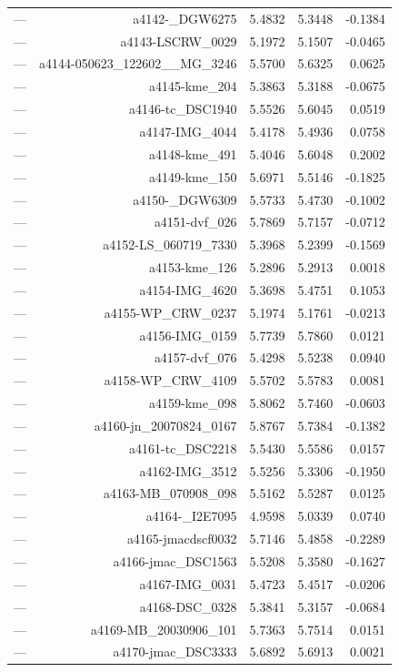 \begin{table}[htbp]
\begin{tabular}{lrrrr}
— & a4142-_DGW6275 & 5.4832 & 5.3448 & -0.1384 \\
— & a4143-LSCRW_0029 & 5.1972 & 5.1507 & -0.0465 \\
— & a4144-050623_122602__MG_3246 & 5.5700 & 5.6325 & 0.0625 \\
— & a4145-kme_204 & 5.3863 & 5.3188 & -0.0675 \\
— & a4146-tc_DSC1940 & 5.5526 & 5.6045 & 0.0519 \\
— & a4147-IMG_4044 & 5.4178 & 5.4936 & 0.0758 \\
— & a4148-kme_491 & 5.4046 & 5.6048 & 0.2002 \\
— & a4149-kme_150 & 5.6971 & 5.5146 & -0.1825 \\
— & a4150-_DGW6309 & 5.5733 & 5.4730 & -0.1002 \\
— & a4151-dvf_026 & 5.7869 & 5.7157 & -0.0712 \\
— & a4152-LS_060719_7330 & 5.3968 & 5.2399 & -0.1569 \\
— & a4153-kme_126 & 5.2896 & 5.2913 & 0.0018 \\
— & a4154-IMG_4620 & 5.3698 & 5.4751 & 0.1053 \\
— & a4155-WP_CRW_0237 & 5.1974 & 5.1761 & -0.0213 \\
— & a4156-IMG_0159 & 5.7739 & 5.7860 & 0.0121 \\
— & a4157-dvf_076 & 5.4298 & 5.5238 & 0.0940 \\
— & a4158-WP_CRW_4109 & 5.5702 & 5.5783 & 0.0081 \\
— & a4159-kme_098 & 5.8062 & 5.7460 & -0.0603 \\
— & a4160-jn_20070824_0167 & 5.8767 & 5.7384 & -0.1382 \\
— & a4161-tc_DSC2218 & 5.5430 & 5.5586 & 0.0157 \\
— & a4162-IMG_3512 & 5.5256 & 5.3306 & -0.1950 \\
— & a4163-MB_070908_098 & 5.5162 & 5.5287 & 0.0125 \\
— & a4164-_I2E7095 & 4.9598 & 5.0339 & 0.0740 \\
— & a4165-jmacdscf0032 & 5.7146 & 5.4858 & -0.2289 \\
— & a4166-jmac_DSC1563 & 5.5208 & 5.3580 & -0.1627 \\
— & a4167-IMG_0031 & 5.4723 & 5.4517 & -0.0206 \\
— & a4168-DSC_0328 & 5.3841 & 5.3157 & -0.0684 \\
— & a4169-MB_20030906_101 & 5.7363 & 5.7514 & 0.0151 \\
— & a4170-jmac_DSC3333 & 5.6892 & 5.6913 & 0.0021 \\

\end{tabular}
\end{table}
